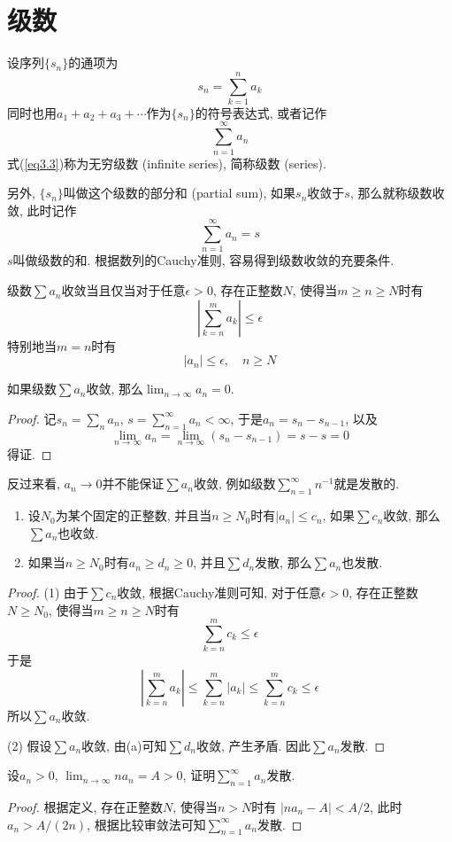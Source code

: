 \documentclass[cn,12pt,math=mtpro2,citestyle=gb7714-2015,bibstyle=gb7714-2015,twocol]{elegantbook}
\newcommand{\limn}{\lim_{n\to\infty}}
\begin{document}
\section{级数}
\begin{definition}
设序列$\{s_n\}$的通项为
$$s_n=\sum_{k=1}^{n}a_k$$
同时也用$a_1+a_2+a_3+\cdots$作为$\{s_n\}$的符号表达式, 或者记作
\begin{equation}\label{eq3.3}
  \sum_{n=1}^{\infty}a_n
\end{equation}
式(\ref{eq3.3})称为无穷级数 (infinite series), 简称级数 (series).
\end{definition}
另外, $\{s_n\}$叫做这个级数的部分和 (partial sum), 如果$s_n$收敛于$s$, 那么就称级数收敛, 此时记作
$$\sum_{n=1}^{\infty}a_n=s$$
$s$叫做级数的和. 根据数列的Cauchy准则, 容易得到级数收敛的充要条件.
\begin{theorem}[Cauchy准则]
  级数$\sum a_n$收敛当且仅当对于任意$\epsilon>0$, 存在正整数$N$, 使得当$m\geq n\geq N$时有
  $$\left|\sum_{k=n}^{m}a_k\right|\leq\epsilon$$
  特别地当$m=n$时有
$$|a_n|\leq\epsilon, \quad n\geq N$$
\end{theorem}
\begin{corollary}
  如果级数$\sum a_n$收敛, 那么$\limn a_n=0$.
\end{corollary}
\begin{proof}
  记$s_n=\sum_na_n$, $s=\sum_{n=1}^{\infty} a_n<\infty$, 于是$a_n=s_{n}-s_{n-1}$, 以及
  $$\limn a_n=\limn (s_n-s_{n-1})=s-s=0$$
  得证.
\end{proof}
\begin{remark}
反过来看, $a_n\rightarrow0$并不能保证$\sum a_n$收敛, 例如级数$\sum_{n=1}^{\infty} n^{-1}$就是发散的.
\end{remark}
\begin{theorem}[比较审敛法]
\begin{enumerate}[label=(\arabic*)]
\item 设$N_0$为某个固定的正整数, 并且当$n\geq N_0$时有$|a_n|\leq c_n$, 如果$\sum c_n$收敛, 那么$\sum a_n$也收敛.

\item 如果当$n\geq N_0$时有$a_n\geq d_n\geq 0$, 并且$\sum d_n$发散, 那么$\sum a_n$也发散.
\end{enumerate}
\end{theorem}
\begin{proof}
  (1) 由于$\sum c_n$收敛, 根据Cauchy准则可知, 对于任意$\epsilon>0$, 存在正整数$N\geq N_0$, 使得当$m\geq n\geq N$时有
  $$\sum_{k=n}^{m}c_k\leq\epsilon$$
  于是
  $$\left|\sum_{k=n}^{m}a_k\right|\leq\sum_{k=n}^{m}|a_k|\leq\sum_{k=n}^{m}c_k\leq\epsilon$$
  所以$\sum a_n$收敛.

  (2) 假设$\sum a_n$收敛, 由(a)可知$\sum d_n$收敛, 产生矛盾. 因此$\sum a_n$发散.
\end{proof}
\begin{example}
设$a_n>0$, $\limn na_n=A>0$, 证明$\sum_{n=1}^{\infty}a_n$发散.
\end{example}
\begin{proof}
  根据定义, 存在正整数$N$, 使得当$n>N$时有
  $|na_n-A|<A/2$, 此时$a_n>A/(2n)$, 根据比较审敛法可知$\sum_{n=1}^{\infty}a_n$发散.
\end{proof}
\end{document}
